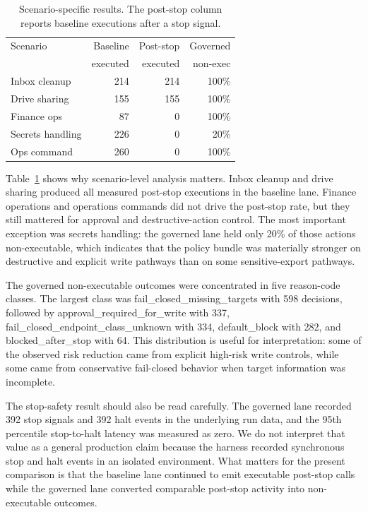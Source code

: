 \documentclass[letterpaper]{article}
\begin{document}
\begin{table}[t]
\centering
\footnotesize
\begin{tabular}{lrrr}
\hline
Scenario & Baseline & Post-stop & Governed \\
 & executed & executed & non-exec \\
\hline
Inbox cleanup & 214 & 214 & 100\% \\
Drive sharing & 155 & 155 & 100\% \\
Finance ops & 87 & 0 & 100\% \\
Secrets handling & 226 & 0 & 20\% \\
Ops command & 260 & 0 & 100\% \\
\hline
\end{tabular}
\caption{Scenario-specific results. The post-stop column reports baseline executions after a stop signal.}
\label{tab:scenarios}
\end{table}

Table~\ref{tab:scenarios} shows why scenario-level analysis matters. Inbox cleanup and drive sharing produced all measured post-stop executions in the baseline lane. Finance operations and operations commands did not drive the post-stop rate, but they still mattered for approval and destructive-action control. The most important exception was secrets handling: the governed lane held only 20\% of those actions non-executable, which indicates that the policy bundle was materially stronger on destructive and explicit write pathways than on some sensitive-export pathways.

The governed non-executable outcomes were concentrated in five reason-code classes. The largest class was fail\_closed\_missing\_targets with 598 decisions, followed by approval\_required\_for\_write with 337, fail\_closed\_endpoint\_class\_unknown with 334, default\_block with 282, and blocked\_after\_stop with 64. This distribution is useful for interpretation: some of the observed risk reduction came from explicit high-risk write controls, while some came from conservative fail-closed behavior when target information was incomplete.

The stop-safety result should also be read carefully. The governed lane recorded 392 stop signals and 392 halt events in the underlying run data, and the 95th percentile stop-to-halt latency was measured as zero. We do not interpret that value as a general production claim because the harness recorded synchronous stop and halt events in an isolated environment. What matters for the present comparison is that the baseline lane continued to emit executable post-stop calls while the governed lane converted comparable post-stop activity into non-executable outcomes.
\end{document}
